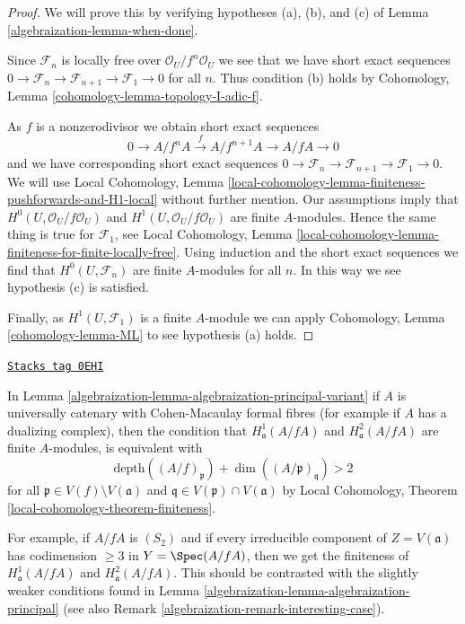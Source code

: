 \begin{proof}

We will prove this by verifying hypotheses (a), (b), and (c) of
Lemma \ref{algebraization-lemma-when-done}.

\medskip\noindent
Since $\mathcal{F}_n$ is locally free over $\mathcal{O}_U/f^n\mathcal{O}_U$
we see that we have short exact sequences
$0 \to \mathcal{F}_n \to \mathcal{F}_{n + 1} \to \mathcal{F}_1 \to 0$
for all $n$. Thus condition (b) holds by
Cohomology, Lemma \ref{cohomology-lemma-topology-I-adic-f}.

\medskip\noindent
As $f$ is a nonzerodivisor we obtain short exact sequences
$$
0 \to A/f^nA \xrightarrow{f} A/f^{n + 1}A \to A/fA \to 0
$$
and we have corresponding short exact sequences
$0 \to \mathcal{F}_n \to \mathcal{F}_{n + 1} \to \mathcal{F}_1 \to 0$.
We will use
Local Cohomology, Lemma
\ref{local-cohomology-lemma-finiteness-pushforwards-and-H1-local}
without further mention. Our assumptions imply that
$H^0(U, \mathcal{O}_U/f\mathcal{O}_U)$ and
$H^1(U, \mathcal{O}_U/f\mathcal{O}_U)$
are finite $A$-modules. Hence the same thing is true for $\mathcal{F}_1$, see
Local Cohomology, Lemma
\ref{local-cohomology-lemma-finiteness-for-finite-locally-free}.
Using induction and the short exact sequences we find that
$H^0(U, \mathcal{F}_n)$ are finite $A$-modules for all $n$.
In this way we see hypothesis (c) is satisfied.

\medskip\noindent
Finally, as $H^1(U, \mathcal{F}_1)$ is a finite $A$-module
we can apply Cohomology, Lemma \ref{cohomology-lemma-ML}
to see hypothesis (a) holds.
\end{proof}

\begin{remark}
\label{algebraization-remark-interesting-case-variant}
\href{https://stacks.math.columbia.edu/tag/0EHI}{\texttt{Stacks tag 0EHI}}

In Lemma \ref{algebraization-lemma-algebraization-principal-variant}
if $A$ is universally catenary with Cohen-Macaulay
formal fibres (for example if $A$ has a dualizing complex), then
the condition that
$H^1_\mathfrak a(A/fA)$ and $H^2_\mathfrak a(A/fA)$
are finite $A$-modules, is equivalent with
$$
\text{depth}((A/f)_\mathfrak p) + \dim((A/\mathfrak p)_\mathfrak q) > 2
$$
for all $\mathfrak p \in V(f) \setminus V(\mathfrak a)$
and $\mathfrak q \in V(\mathfrak p) \cap V(\mathfrak a)$
by Local Cohomology, Theorem \ref{local-cohomology-theorem-finiteness}.

\medskip\noindent
For example, if $A/fA$ is $(S_2)$ and if every irreducible
component of $Z = V(\mathfrak a)$ has codimension $\geq 3$
in $Y = \Spec(A/fA)$, then we get the finiteness of
$H^1_\mathfrak a(A/fA)$ and $H^2_\mathfrak a(A/fA)$.
This should be contrasted with the slightly weaker conditions
found in Lemma \ref{algebraization-lemma-algebraization-principal}
(see also Remark \ref{algebraization-remark-interesting-case}).
\end{remark}

